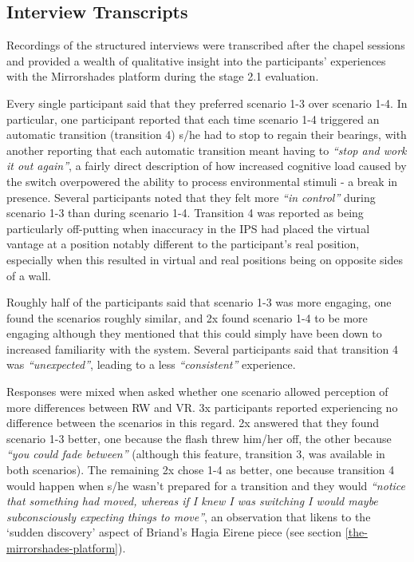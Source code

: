 \subsection{Interview Transcripts}

Recordings of the structured interviews were transcribed after the chapel sessions and provided a wealth of qualitative insight into the participants' experiences with the Mirrorshades platform during the stage 2.1 evaluation.

Every single participant said that they preferred scenario 1-3 over scenario 1-4. In particular, one participant  reported that each time scenario 1-4 triggered an automatic transition (transition 4) s/he had to stop to regain their bearings, with another reporting that each automatic transition meant having to \textit{``stop and work it out again''}, a fairly direct description of how increased cognitive load caused by the switch overpowered the ability to process environmental stimuli - a break in presence. Several participants noted that they felt more \textit{``in control''} during scenario 1-3 than during scenario 1-4. Transition 4 was reported as being particularly off-putting when inaccuracy in the IPS had placed the virtual vantage at a position notably different to the participant's real position, especially when this resulted in virtual and real positions being on opposite sides of a wall.

Roughly half of the participants said that scenario 1-3 was more engaging, one found the scenarios roughly similar, and 2x found scenario 1-4 to be more engaging although they mentioned that this could simply have been down to increased familiarity with the system. Several participants said that transition 4 was \textit{``unexpected''}, leading to a less \textit{``consistent''} experience.

Responses were mixed when asked whether one scenario allowed perception of more differences between RW and VR. 3x participants reported experiencing no difference between the scenarios in this regard. 2x answered that they found scenario 1-3 better, one because the flash threw him/her off, the other because \textit{``you could fade between''}  (although this feature, transition 3, was available in both scenarios). The remaining 2x chose 1-4 as better, one because transition 4 would happen when s/he wasn't prepared for a transition and they would \textit{``notice that something had moved, whereas if I knew I was switching I would maybe subconsciously expecting things to move''}, an observation that likens to the `sudden discovery' aspect of Briand's Hagia Eirene piece (see section \ref{the-mirrorshades-platform}).

